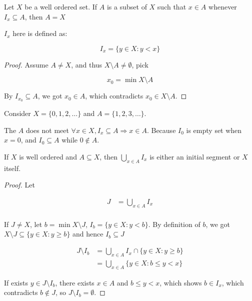 \begin{thm}
    Let $X$ be a well ordered set. If $A$ is a subset
    of $X$ such that $x \in A$ whenever $I_x \subseteq A$, then $A = X$

    $I_x$ here is defined as:

    \[
        I_x = \{ y \in X: y < x  \}
    \]
\end{thm}

\begin{proof}
    Assume $A \ne X$, and thus $X \setminus A \ne \emptyset$, pick 

    \[
        x_0 = \min X \setminus A
    \]

    By $I_{x_0} \subseteq A$, we got $x_0 \in A$, which contradicts $x_0 \in X \setminus A$.
\end{proof}

\begin{example}
    Consider $X = \{ 0,1,2, \dots \}$ and $A = \{ 1,2,3, \dots \}$. 

    The $A$ does not meet $\forall x \in X, I_x \subseteq A \Rightarrow x \in A$. Because $I_0$
    is empty set when $x=0$, and $I_0 \subseteq A$ while $0 \notin A$.
\end{example}

\begin{thm}
    If $X$ is well ordered and $A \subseteq X$, then $\bigcup_{x \in A} I_x$
    is either an initial segment or $X$ itself.
\end{thm}

\begin{proof}
    Let 
    
    \begin{align*}
        J &= \bigcup_{x \in A} I_x \\
    \end{align*}

    If $J \ne X$, let $b = \min X \setminus J$, $I_b = \{ y \in X:  y <  b\}$. 
    By definition of $b$, we got $X \setminus J \subseteq \{ y \in X: y \ge b\}$
    and hence $I_b \subseteq J$


        \begin{align*}
            J \setminus I_b &= \bigcup_{x \in A} I_x \cap \{ y \in X: y \ge b\} \\
            &= \bigcup_{x \in A} \{y \in X: b \le y < x\}
        \end{align*}

    If exists $y \in J \setminus I_b$, there exists $x \in A$ and $b \le y < x$, which shows $b \in I_x$, which 
    contradicts $b \notin J$, so $J \setminus I_b = \emptyset$.

\end{proof}

